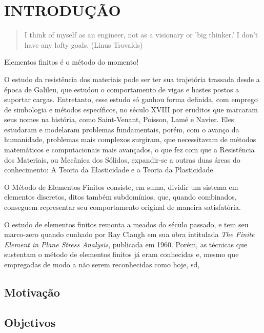

\chapter{INTRODUÇÃO}

\begin{quote}
    I think of myself as an engineer, not as a visionary or 'big thinker.' I don't have any lofty goals.
    (Linus Trovalds)  
\end{quote}


Elementos finitos é o método do momento!

O estudo da resistência dos materiais pode ser ter sua trajetória trassada desde a época de Galileu, que estudou o comportamento de vigas e hastes postos a suportar cargas. Entretanto, esse estudo só ganhou forma definida, com emprego de simbologia e métodos específicos, no século XVIII por eruditos que marcaram seus nomes na história, como Saint-Venant, Poisson, Lamé e Navier. Eles estudaram e modelaram problemas fundamentais, porém, com o avanço da humanidade, problemas mais complexos surgiram, que necessitavam de métodos matemáticos e computacionais mais avançados, o que fez com que a Resistência dos Materiais, ou Mecânica dos Sólidos, expandir-se a outras duas áreas do conhecimento: A Teoria da Elasticidade e a Teoria da Plasticidade. \cite{Hibbeler}





O Método de Elementos Finitos consiste, em suma, dividir um sistema em elementos discretos, ditos também subdomínios, que, quando combinados, conseguem representar seu comportamento original de maneira satisfatória. \cite{Bittencourt}

O estudo de elementos finitos remonta a meados do século passado, e tem seu marco-zero quando cunhado por Ray Claugh em sua obra intitulada \textit{The Finite Element in Plane Stress Analysis}, publicada em 1960. Porém, as técnicas que sustentam o método de elementos finitos já eram conhecidas e, mesmo que empregadas de modo a não serem reconhecidas como hoje, sd,  \cite{Azevedo}


\section{Motivação}

\section{Objetivos}